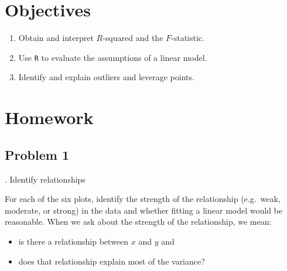 \documentclass[
]{book}
\providecommand{\tightlist}{%
  \setlength{\itemsep}{0pt}\setlength{\parskip}{0pt}}
\begin{document}
\hypertarget{objectives-26}{%
\section{Objectives}\label{objectives-26}}

\begin{enumerate}
\def\labelenumi{\arabic{enumi})}
\tightlist
\item
  Obtain and interpret \(R\)-squared and the \(F\)-statistic.\\
\item
  Use \texttt{R} to evaluate the assumptions of a linear model.\\
\item
  Identify and explain outliers and leverage points.
\end{enumerate}

\hypertarget{homework-27}{%
\section{Homework}\label{homework-27}}

\hypertarget{problem-1-27}{%
\subsection{Problem 1}\label{problem-1-27}}

. Identify relationships

For each of the six plots, identify the strength of the relationship (e.g.~weak, moderate, or strong) in the data and whether fitting a linear model would be reasonable. When we ask about the strength of the relationship, we mean:

\begin{itemize}
\tightlist
\item
  is there a relationship between \(x\) and \(y\) and
\item
  does that relationship explain most of the variance?
\end{itemize}
\end{document}
